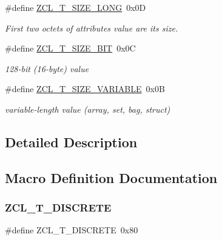 \begin{DoxyCompactItemize}
\mbox{\label{group__zcl__types_gaeee15697985458060bf5f85c00c15a41}} 
\#define \hyperlink{group__zcl__types_gaeee15697985458060bf5f85c00c15a41}{Z\+C\+L\+\_\+\+T\+\_\+\+S\+I\+Z\+E\+\_\+\+L\+O\+NG}~0x0D
\begin{DoxyCompactList}\small\item\em First two octets of attribute\textquotesingle{}s value are its size. \end{DoxyCompactList}\item 
\mbox{\label{group__zcl__types_gad7a8d44d98b6872f187b1e0748ec7417}} 
\#define \hyperlink{group__zcl__types_gad7a8d44d98b6872f187b1e0748ec7417}{Z\+C\+L\+\_\+\+T\+\_\+\+S\+I\+Z\+E\+\_\+B\+IT}~0x0C
\begin{DoxyCompactList}\small\item\em 128-\/bit (16-\/byte) value \end{DoxyCompactList}\item 
\mbox{\label{group__zcl__types_ga7691965c8c435fdafe30025c05817cf9}} 
\#define \hyperlink{group__zcl__types_ga7691965c8c435fdafe30025c05817cf9}{Z\+C\+L\+\_\+\+T\+\_\+\+S\+I\+Z\+E\+\_\+\+V\+A\+R\+I\+A\+B\+LE}~0x0B
\begin{DoxyCompactList}\small\item\em variable-\/length value (array, set, bag, struct) \end{DoxyCompactList}\end{DoxyCompactItemize}


\subsection{Detailed Description}


\subsection{Macro Definition Documentation}
\mbox{\label{group__zcl__types_ga3e9bf95af4f58a0c9c5c34639b0dda29}} 
\subsubsection{\texorpdfstring{Z\+C\+L\+\_\+\+T\+\_\+\+D\+I\+S\+C\+R\+E\+TE}{ZCL\_T\_DISCRETE}}
{\footnotesize\ttfamily \#define Z\+C\+L\+\_\+\+T\+\_\+\+D\+I\+S\+C\+R\+E\+TE~0x80}



